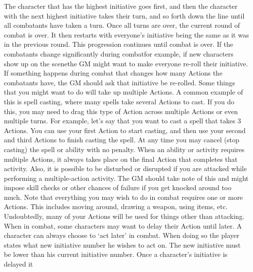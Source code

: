 \documentclass[twoside]{book}
\begin{document}
   The character that has the highest initiative goes
             first, and then the character with the next highest
             initiative takes their turn, and so forth down the line
             until all combatants have taken a turn.  Once all turns are over, the current round of combat
             is over. It then restarts with everyone's initiative
             being the same as it was in the previous round. This
             progression continues until combat is over. If the
             combatants change significantly during combatfor
             example, if new characters show up on the scenethe GM
             might want to make everyone re-roll their initiative. If
             something happens during combat that changes how many
             Actions the combatants have, the GM should ask that
             initiative be re-rolled.  Some things that you might want to do will take up
             multiple Actions. A common example of this is spell casting,
             where many spells take several Actions to cast. If you do
             this, you may need to drag this type of Action across
             multiple Actions or even multiple turns. For example,
             let's say that you want to cast a spell that takes 3
             Actions. You can use your first Action to start casting, and
             then use your second and third Actions to finish casting the
             spell. At any time you may cancel (stop casting) the spell
             or ability with no penalty. When an ability or activity
             requires multiple Actions, it always takes place on the
             final Action that completes that activity. Also, it is
             possible to be disturbed or disrupted if you are attacked
             while performing a multiple-action activity. The GM should
             take note of this and might impose skill checks or other
             chances of failure if you get knocked around too much.
              Note that everything you may wish to do in combat
             requires one or more Actions. This includes moving around,
             drawing a weapon, using items, etc. Undoubtedly, many of
             your Actions will be used for things other than attacking.
              When in combat, some characters may want to delay
             their Action until later. A character can always choose to
             `act later' in combat. When doing so the player
             states what new initiative number he wishes to act on. The
             new initiative must be lower than his current initiative
             number. Once a character's initiative is delayed it
\end{document}
